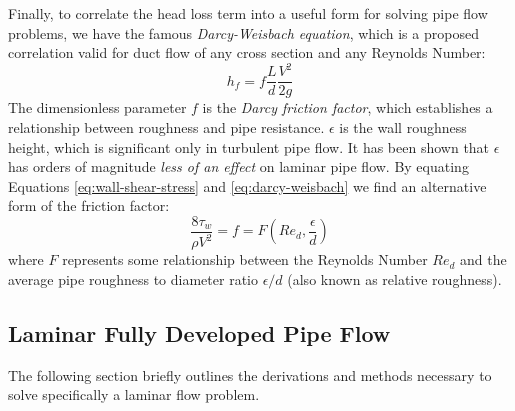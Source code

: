 \documentclass[10pt]{article} %
\numberwithin{equation}{section} %
\begin{document}
\begin{multicols}{2}
Finally, to correlate the head loss term into a useful form for solving pipe flow problems, we have the famous \textit{Darcy-Weisbach equation}, which is a proposed correlation valid for duct flow of any cross section and any Reynolds Number:
\begin{equation} \label{eq:darcy-weisbach}
h_{f} = f{\frac{L}{d}}{\frac{V^{2}}{2{g}}}
\end{equation}
The dimensionless parameter $f$ is the \textit{Darcy friction factor}, which establishes a relationship between roughness and pipe resistance. $\epsilon$ is the wall roughness height, which is significant only in turbulent pipe flow. It has been shown that $\epsilon$ has orders of magnitude \textit{less of an effect} on laminar pipe flow. By equating Equations \ref{eq:wall-shear-stress} and \ref{eq:darcy-weisbach} we find an alternative form of the friction factor:
\begin{equation} \label{eq:darcy-friction}
\frac{8 \tau_{w}}{\rho V^{2}} = f = F(Re_{d}, \frac{\epsilon}{d})
\end{equation}
where $F$ represents some relationship between the Reynolds Number $Re_{d}$ and the average pipe roughness to diameter ratio $\epsilon / d$ (also known as relative roughness).

\subsection{Laminar Fully Developed Pipe Flow}
The following section briefly outlines the derivations and methods necessary to solve specifically a laminar flow problem. 


\end{multicols}
\end{document}
